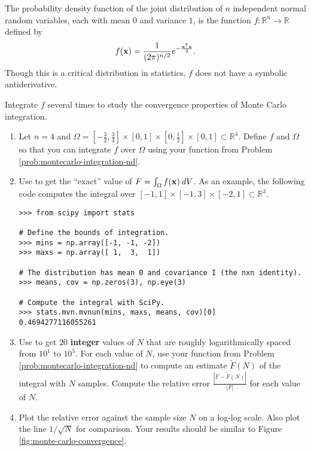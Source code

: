 \begin{problem}
The probability density function of the joint distribution of $n$ independent normal random variables, each with mean $0$ and variance $1$, is the function $f:\mathbb{R}^n\rightarrow\mathbb{R}$ defined by
\[
f(\mathbf{x}) = \frac{1}{(2 \pi)^{n/2}} e^{- \frac{\mathbf{x}^{\mathsf T}\mathbf{x}}{2}}.
\]
Though this is a critical distribution in statistics, $f$ does not have a symbolic antiderivative.

Integrate $f$ several times to study the convergence properties of Monte Carlo integration.

\begin{enumerate}
\item Let $n=4$ and $\Omega=[-\frac{3}{2}, \frac{3}{4}]\times[0,1]\times[0, \frac{1}{2}]\times[0,1] \subset \mathbb{R}^4$.
Define $f$ and $\Omega$ so that you can integrate $f$ over $\Omega$ using your function from Problem \ref{prob:montecarlo-integration-nd}.

\item Use  to get the ``exact'' value of $F = \int_\Omega f(\mathbf{x})\:dV$.
As an example, the following code computes the integral over $[-1,1]\times [-1,3]\times[-2,1] \subset \mathbb{R}^3$.
\begin{lstlisting}
>>> from scipy import stats

# Define the bounds of integration.
>>> mins = np.array([-1, -1, -2])
>>> maxs = np.array([ 1,  3,  1])

# The distribution has mean 0 and covariance I (the nxn identity).
>>> means, cov = np.zeros(3), np.eye(3)

# Compute the integral with SciPy.
>>> stats.mvn.mvnun(mins, maxs, means, cov)[0]
0.4694277116055261
\end{lstlisting}

\item Use  to get $20$ \textbf{integer} values of $N$ that are roughly logarithmically spaced from $10^1$ to $10^5$.
For each value of $N$, use your function from Problem \ref{prob:montecarlo-integration-nd} to compute an estimate $\tilde{F}(N)$ of the integral with $N$ samples.
Compute the relative error $\frac{|F - \tilde{F}(N)|}{|F|}$ for each value of $N$.

\item Plot the relative error against the sample size $N$ on a log-log scale.
Also plot the line $1/\sqrt{N}$ for comparison.
Your results should be similar to Figure \ref{fig:monte-carlo-convergence}.
\end{enumerate}
\end{problem}

